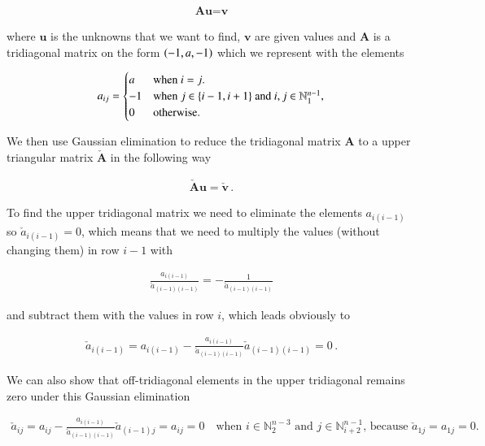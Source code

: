 \documentclass[11pt,english,a4paper]{article}
\begin{document}
\begin{flushleft}
\begin{align*}
\textbf{A}\textbf{u} = \textbf{v}
\end{align*} 

where $\textbf{u}$ is the unknowns that we want to find, $\textbf{v}$ are given values and $\textbf{A}$ is a tridiagonal matrix on the form $\left({-1,a,-1}\right)$ which we represent with the elements

\begin{align*}
a_{ij} = \begin{cases} a & \text{when $i=j$.} \\ -1 &\text{when $j\in\left\lbrace{i-1,i+1}\right\rbrace$ and $i,j\in\mathbb{N}_1^{n-1}$,} \\ 0 & \text{otherwise.}\end{cases}
\end{align*}

We then use Gaussian elimination to reduce the tridiagonal matrix $\textbf{A}$ to a upper triangular matrix $\check{\textbf{A}}$ in the following way

\begin{align*}
\check{\textbf{A}}\textbf{u} = \check{\textbf{v}}\,.
\end{align*} 

To find the upper tridiagonal matrix we need to eliminate the elements $a_{i(i-1)}$ so $\check{a}_{i(i-1)} = 0$, which means that we need to multiply the values (without changing them) in row $i-1$ with 

\begin{align*}
\frac{a_{i(i-1)}}{\check{a}_{(i-1)(i-1)}} = -\frac{1}{\check{a}_{(i-1)(i-1)}} 
\end{align*}

and subtract them with the values in row $i$, which leads obviously to

\begin{align*}
\check{a}_{i(i-1)} = a_{i(i-1)} - \frac{a_{i(i-1)}}{\check{a}_{(i-1)(i-1)}} \check{a}_{(i-1)(i-1)} = 0\,.
\end{align*}

We can also show that off-tridiagonal elements in the upper tridiagonal remains zero under this Gaussian elimination

\begin{align*}
\check{a}_{ij} = a_{ij} - \frac{a_{i(i-1)}}{\check{a}_{(i-1)(i-1)}} \check{a}_{(i-1)j} = a_{ij} = 0 \quad \text{when $i\in\mathbb{N}_2^{n-3}$ and $j\in\mathbb{N}_{i+2}^{n-1}$, because $\check{a}_{1j}=a_{1j} = 0$.}
\end{align*}


\end{flushleft}
\end{document}
